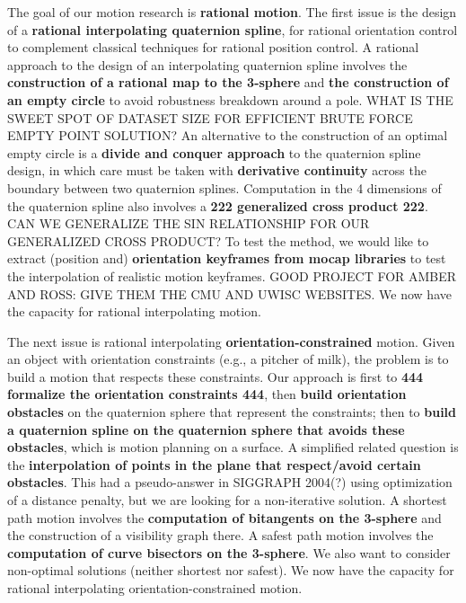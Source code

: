 \documentclass[12pt]{article}
\begin{document}
The goal of our motion research is {\bf rational motion}.
The first issue is the design of a {\bf rational interpolating quaternion spline},
for rational orientation control to complement classical techniques for rational position control.
A rational approach to the design of an interpolating quaternion spline involves the
{\large {\bf construction of a rational map to the 3-sphere }} and {\bf the construction of an empty circle}
to avoid robustness breakdown around a pole.
WHAT IS THE SWEET SPOT OF DATASET SIZE FOR EFFICIENT BRUTE FORCE EMPTY POINT SOLUTION?
An alternative to the construction of an optimal empty circle is a {\bf divide and conquer 
approach} to the quaternion spline design, in which care must be taken with 
{\bf derivative continuity} across the boundary between two quaternion splines.
Computation in the 4 dimensions of the quaternion spline also involves a 
{\large {\bf 222 generalized cross product 222}}.
CAN WE GENERALIZE THE SIN RELATIONSHIP FOR OUR GENERALIZED CROSS PRODUCT?
To test the method, we would like to extract (position and) 
{\bf orientation keyframes from mocap libraries} to test the interpolation of 
realistic motion keyframes.
GOOD PROJECT FOR AMBER AND ROSS: GIVE THEM THE CMU AND UWISC WEBSITES.
We now have the capacity for rational interpolating motion.

The next issue is rational interpolating {\bf orientation-constrained} motion.
Given an object with orientation constraints (e.g., a pitcher of milk),
the problem is to build a motion that respects these constraints.
Our approach is first to {\large {\bf 444 formalize the orientation constraints 444}}, 
then {\bf build orientation obstacles} on the quaternion sphere 
that represent the constraints;
then to {\bf build a quaternion spline on the quaternion sphere that avoids these obstacles},
which is motion planning on a surface.
A simplified related question is the {\bf interpolation of points in the plane that respect/avoid
certain obstacles}.  This had a pseudo-answer in SIGGRAPH 2004(?) using optimization of 
a distance penalty, but we are looking for a non-iterative solution.
A shortest path motion involves the {\bf computation of bitangents on the 3-sphere}
and the construction of a visibility graph there.
A safest path motion involves the {\bf computation of curve bisectors on the 3-sphere}.
We also want to consider non-optimal solutions (neither shortest nor safest).
We now have the capacity for rational interpolating orientation-constrained motion.
\end{document}

